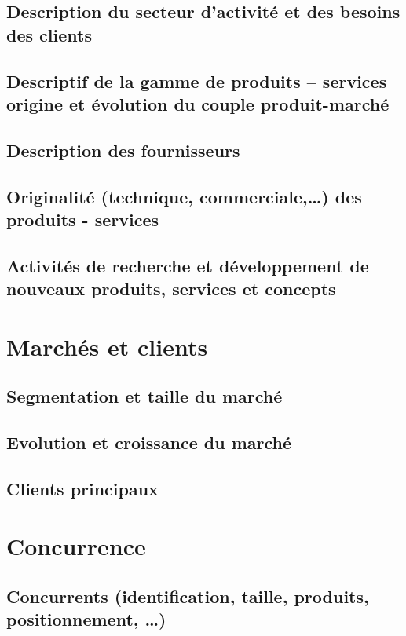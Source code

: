 \documentclass[a4paper]{report}
\begin{document}
\subsection{Description du secteur d'activité et des besoins des clients}

\subsection{Descriptif de la gamme de produits – services origine et
évolution du couple produit-marché}

\subsection{Description des fournisseurs}

\subsection{Originalité (technique, commerciale,…) des produits - services}

\subsection{Activités de recherche et développement de nouveaux produits,
services et concepts}

\section{Marchés et clients}

\subsection{Segmentation et taille du marché}

\subsection{Evolution et croissance du marché}

\subsection{Clients principaux}

\section{Concurrence}

\subsection{Concurrents (identification, taille, produits, positionnement, …)}
\end{document}
